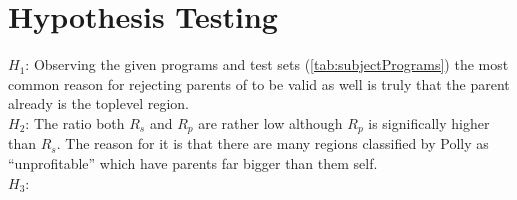 \section{Hypothesis Testing}
\(H_1\): Observing the given programs and test sets (\autoref{tab:subjectPrograms}) the most common reason for rejecting parents of \scop to be valid as well is truly that the parent already is the toplevel region.\\
\(H_2\): The ratio both \(R_s\) and \(R_p\) are rather low although \(R_p\) is significally higher than \(R_s\).
The reason for it is that there are many regions classified by Polly as \enquote{unprofitable} which have parents far bigger than them self.\\
\(H_3\): \\
